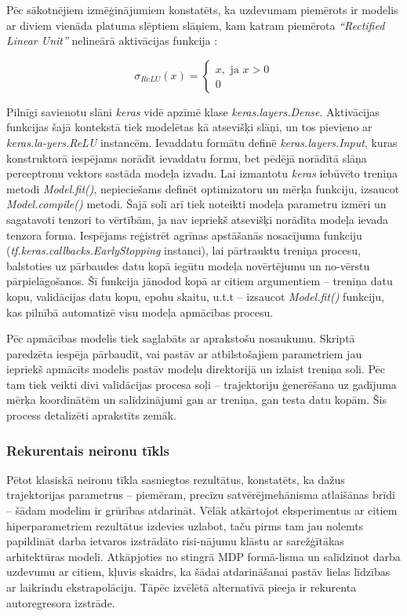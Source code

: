 \documentclass[12pt, a4paper]{article}
\numberwithin{equation}{section} %
\begin{document}
Pēc sākotnējiem izmēģinājumiem konstatēts, ka uzdevumam piemērots ir modelis ar diviem vienāda platuma slēptiem slāņiem, kam katram piemērota \textit{``Rectified Linear Unit''} nelineārā aktivācijas funkcija \cite{tf_relu}:

\begin{equation}
    \sigma_{ReLU}(x) = 
    \begin{cases}
        x, \text{ ja } x > 0 \\
        0
    \end{cases}
\end{equation}

Pilnīgi savienotu slāni \textit{keras} vidē apzīmē klase \textit{keras.layers.Dense}. Aktivācijas funkcijas šajā kontekstā tiek modelētas kā atsevišķi slāņi, un tos pievieno ar \textit{keras.la-yers.ReLU} instancēm. Ievaddatu formātu definē \textit{keras.layers.Input}, kuras konstruktorā iespējams norādīt ievaddatu formu, bet pēdējā norādītā slāņa perceptronu vektors sastāda modeļa izvadu. Lai izmantotu \textit{keras} iebūvēto treniņa metodi \textit{Model.fit()}, nepieciešams definēt optimizatoru un mērķa funkciju, izsaucot \textit{Model.compile()} metodi. Šajā solī arī tiek noteikti modeļa parametru izmēri un sagatavoti tenzori to vērtībām, ja nav iepriekš atsevišķi norādīta modeļa ievada tenzora forma. Iespējams reģistrēt agrīnas apstāšanās nosacījuma funkciju (\textit{tf.keras.callbacks.EarlyStopping} instanci), lai pārtrauktu treniņa procesu, balstoties uz pārbaudes datu kopā iegūtu modeļa novērtējumu un no-vērstu pārpielāgošanos. Šī funkcija jānodod kopā ar citiem argumentiem -- treniņa datu kopu, validācijas datu kopu, epohu skaitu, u.t.t -- izsaucot \textit{Model.fit()} funkciju, kas pilnībā automatizē visu modeļa apmācības procesu.

Pēc apmācības modelis tiek saglabāts ar aprakstošu nosaukumu. Skriptā paredzēta iespēja pārbaudīt, vai pastāv ar atbilstošajiem parametriem jau iepriekš apmācīts modelis pastāv modeļu direktorijā un izlaist treniņa soli. Pēc tam tiek veikti divi validācijas procesa soļi -- trajektoriju ģenerēšana uz gadījuma mērķa koordinātēm un salīdzinājumi gan ar treniņa, gan testa datu kopām. Šis process detalizēti aprakstīts zemāk.

\subsubsection{Rekurentais neironu tīkls}

Pētot klasiskā neironu tīkla sasniegtos rezultātus, konstatēts, ka dažus trajektorijas parametrus -- piemēram, precīzu satvērējmehānisma atlaišānas brīdi -- šādam modelim ir grūrības atdarināt. Vēlāk atkārtojot eksperimentus ar citiem hiperparametriem rezultātus izdevies uzlabot, taču pirms tam jau nolemts papildināt darba ietvaros izstrādāto risi-nājumu klāstu ar sarežģītākas arhitektūras modeli. Atkāpjoties no stingrā MDP formā-lisma un salīdzinot darba uzdevumu ar citiem, kļuvis skaidrs, ka šādai atdarināšanai pastāv lielas līdzības ar laikrindu ekstrapolāciju. Tāpēc izvēlētā alternatīvā pieeja ir rekurenta autoregresora izstrāde.
\end{document}
